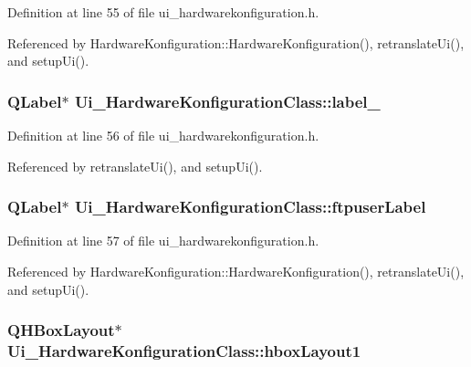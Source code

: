 Definition at line 55 of file ui\_\-hardwarekonfiguration.h.

Referenced by HardwareKonfiguration::HardwareKonfiguration(), retranslateUi(), and setupUi().\hypertarget{class_ui___hardware_konfiguration_class_390d02b0b494e0a143923718a249337a}{
\subsubsection[label\_\-7]{\setlength{\rightskip}{0pt plus 5cm}QLabel$\ast$ {\bf Ui\_\-HardwareKonfigurationClass::label\_}}}
\label{class_ui___hardware_konfiguration_class_390d02b0b494e0a143923718a249337a}




Definition at line 56 of file ui\_\-hardwarekonfiguration.h.

Referenced by retranslateUi(), and setupUi().\hypertarget{class_ui___hardware_konfiguration_class_5ef17f240862378780e2861793858416}{
\subsubsection[ftpuserLabel]{\setlength{\rightskip}{0pt plus 5cm}QLabel$\ast$ {\bf Ui\_\-HardwareKonfigurationClass::ftpuserLabel}}}
\label{class_ui___hardware_konfiguration_class_5ef17f240862378780e2861793858416}




Definition at line 57 of file ui\_\-hardwarekonfiguration.h.

Referenced by HardwareKonfiguration::HardwareKonfiguration(), retranslateUi(), and setupUi().\hypertarget{class_ui___hardware_konfiguration_class_be7ab9d49b40006d2e135e1b817d148a}{
\subsubsection[hboxLayout1]{\setlength{\rightskip}{0pt plus 5cm}QHBoxLayout$\ast$ {\bf Ui\_\-HardwareKonfigurationClass::hboxLayout1}}}
\label{class_ui___hardware_konfiguration_class_be7ab9d49b40006d2e135e1b817d148a}




